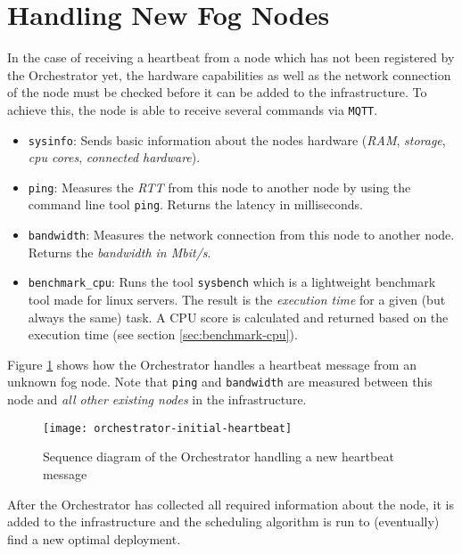\section{Handling New Fog Nodes\label{sec:handling-new-fog-nodes}}

In the case of receiving a heartbeat from a node which has not been registered by the Orchestrator yet, the hardware capabilities as well as the network connection of the node must be checked before it can be added to the infrastructure. To achieve this, the node is able to receive several commands via \texttt{MQTT}.

\begin{itemize}
    \item \texttt{sysinfo}: Sends basic information about the nodes hardware (\textit{RAM}, \textit{storage}, \textit{cpu cores}, \textit{connected hardware}).
    \item \texttt{ping}: Measures the \textit{RTT} from this node to another node by using the command line tool \texttt{ping}. Returns the latency in milliseconds.
    \item \texttt{bandwidth}: Measures the network connection from this node to another node. Returns the \textit{bandwidth in Mbit/s}.
    \item \texttt{benchmark\_cpu}: Runs the tool \texttt{sysbench} which is a lightweight benchmark tool made for linux servers. The result is the \textit{execution time} for a given (but always the same) task. A CPU score is calculated and returned based on the execution time (see section \ref{sec:benchmark-cpu}).
\end{itemize}

Figure \ref{fig:orchestrator-initial-heartbeat} shows how the Orchestrator handles a heartbeat message from an unknown fog node.
Note that \texttt{ping} and \texttt{bandwidth} are measured between this node and \textit{all other existing nodes} in the infrastructure.

\begin{figure}[htb]
    \centering
    \texttt{[image: orchestrator-initial-heartbeat]}
    \caption{Sequence diagram of the Orchestrator handling a new heartbeat message}
    \label{fig:orchestrator-initial-heartbeat}
\end{figure}

After the Orchestrator has collected all required information about the node, it is added to the infrastructure and the scheduling algorithm is run to (eventually) find a new optimal deployment.

